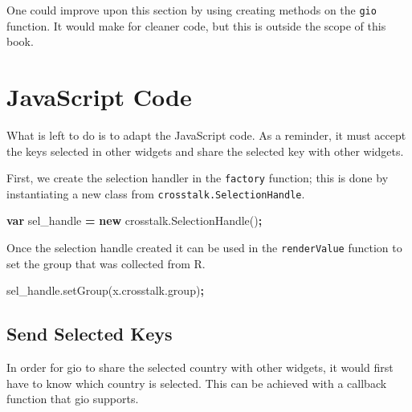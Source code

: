 \documentclass[10pt,]{krantz}
\makeatletter
\newenvironment{Shaded}{\begin{snugshade}}{\end{snugshade}}
\newcommand{\AttributeTok}[1]{\textcolor[rgb]{0.61,0.61,0.61}{#1}}
\newcommand{\KeywordTok}[1]{\textcolor[rgb]{0.27,0.27,0.27}{\textbf{#1}}}
\newcommand{\NormalTok}[1]{#1}
\newcommand{\OperatorTok}[1]{\textcolor[rgb]{0.43,0.43,0.43}{\textbf{#1}}}
\newcommand{\VariableTok}[1]{\textcolor[rgb]{0,0,0}{#1}}
\newenvironment{kframe}{%
\medskip{}
\setlength{\fboxsep}{.8em}
 \def\at@end@of@kframe{}%
 \ifinner\ifhmode%
  \def\at@end@of@kframe{\end{minipage}}%
  \begin{minipage}{\columnwidth}%
 \fi\fi%
 \def\FrameCommand##1{\hskip\@totalleftmargin \hskip-\fboxsep
 \colorbox{shadecolor}{##1}\hskip-\fboxsep
     \hskip-\linewidth \hskip-\@totalleftmargin \hskip\columnwidth}%
 \MakeFramed {\advance\hsize-\width
   \@totalleftmargin\z@ \linewidth\hsize
   \@setminipage}}%
 {\par\unskip\endMakeFramed%
 \at@end@of@kframe}
\renewenvironment{Shaded}{\begin{kframe}}{\end{kframe}}
\newenvironment{rmdblock}[1]
  {
  \begin{itemize}
  \renewcommand{\labelitemi}{
    \raisebox{-.7\height}[0pt][0pt]{
      {\setkeys{Gin}{width=3em,keepaspectratio}\texttt{[image: images/\#1]}}
    }
  }
  \setlength{\fboxsep}{1em}
  \begin{kframe}
  \item
  }
  {
  \end{kframe}
  \end{itemize}
  }
\newenvironment{rmdnote}
  {\begin{rmdblock}{note}}
  {\end{rmdblock}}
\makeatother
\begin{document}
\begin{rmdnote}
One could improve upon this section by using creating methods on the
\texttt{gio} function. It would make for cleaner code, but this is
outside the scope of this book.
\end{rmdnote}

\hypertarget{linking-widgets-js}{%
\section{JavaScript Code}\label{linking-widgets-js}}

What is left to do is to adapt the JavaScript code. As a reminder, it must accept the keys selected in other widgets and share the selected key with other widgets.

First, we create the selection handler in the \texttt{factory} function; this is done by instantiating a new class from \texttt{crosstalk.SelectionHandle}.

\begin{Shaded}
\begin{Highlighting}[]
\KeywordTok{var}\NormalTok{ sel_handle }\OperatorTok{=} \KeywordTok{new} \VariableTok{crosstalk}\NormalTok{.}\AttributeTok{SelectionHandle}\NormalTok{()}\OperatorTok{;}
\end{Highlighting}
\end{Shaded}

Once the selection handle created it can be used in the \texttt{renderValue} function to set the group that was collected from R.

\begin{Shaded}
\begin{Highlighting}[]
\VariableTok{sel_handle}\NormalTok{.}\AttributeTok{setGroup}\NormalTok{(}\VariableTok{x}\NormalTok{.}\VariableTok{crosstalk}\NormalTok{.}\AttributeTok{group}\NormalTok{)}\OperatorTok{;}
\end{Highlighting}
\end{Shaded}

\hypertarget{linking-widgets-send-keys}{%
\subsection{Send Selected Keys}\label{linking-widgets-send-keys}}

In order for gio to share the selected country with other widgets, it would first have to know which country is selected. This can be achieved with a callback function that gio supports.
\end{document}
